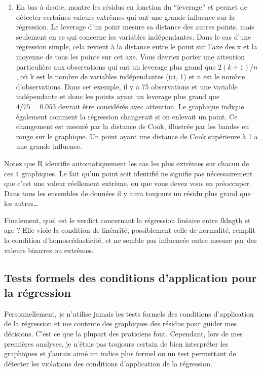 \documentclass[12pt,]{book}
\makeatletter
\newenvironment{kframe}{%
\medskip{}
\setlength{\fboxsep}{.8em}
 \def\at@end@of@kframe{}%
 \ifinner\ifhmode%
  \def\at@end@of@kframe{\end{minipage}}%
  \begin{minipage}{\columnwidth}%
 \fi\fi%
 \def\FrameCommand##1{\hskip\@totalleftmargin \hskip-\fboxsep
 \colorbox{shadecolor}{##1}\hskip-\fboxsep
     \hskip-\linewidth \hskip-\@totalleftmargin \hskip\columnwidth}%
 \MakeFramed {\advance\hsize-\width
   \@totalleftmargin\z@ \linewidth\hsize
   \@setminipage}}%
 {\par\unskip\endMakeFramed%
 \at@end@of@kframe}
\newenvironment{rmdblock}[1]
  {
  \begin{itemize}
  \renewcommand{\labelitemi}{
    \raisebox{-.7\height}[0pt][0pt]{
      {\setkeys{Gin}{width=3em,keepaspectratio}\texttt{[image: images/\#1]}}
    }
  }
  \setlength{\fboxsep}{1em}
  \begin{kframe}
  \item
  }
  {
  \end{kframe}
  \end{itemize}
  }
\newenvironment{rmdwarning}
  {\begin{rmdblock}{warning}}
  {\end{rmdblock}}
\makeatother
\begin{document}
\begin{enumerate}
\item
  En bas à droite, montre les résidus en fonction du ``leverage'' et permet de détecter certaines valeurs extrêmes qui ont une grande influence sur la régression. Le leverage d'un point mesure sa distance des autres points, mais seulement en ce qui concerne les variables indépendantes. Dans le cas d'une régression simple, cela revient à la distance entre le point sur l'axe des x et la moyenne de tous les points sur cet axe. Vous devriez porter une attention particulière aux observations qui ont un leverage plus grand que \(2(k+1)/n\), où k est le nombre de variables indépendantes (ici, 1) et n est le nombre d'observations. Dans cet exemple, il y a 75 observations et une variable indépendante et donc les points ayant un leverage plus grand que \(4 / 75 = 0.053\) devrait être considérés avec attention. Le graphique indique également comment la régression changerait si on enlevait un point. Ce changement est mesuré par la distance de Cook, illustrée par les bandes en rouge sur le graphique. Un point ayant une distance de Cook supérieure à 1 a une grande influence.
\end{enumerate}

\begin{rmdwarning}
Notez que R identifie automatiquement les cas les plus extrèmes sur chacun de ces 4 graphiques. Le fait qu'un point soit identifié ne signifie pas nécessairement que c'est une valeur réellement extrème, ou que vous devez vous en préoccuper. Dans tous les ensembles de données il y aura toujours un résidu plus grand que les autres\ldots{}
\end{rmdwarning}

Finalement, quel est le verdict concernant la régression linéaire entre fklngth et age ? Elle viole la condition de linéarité, possiblement celle de normalité, remplit la condition d'homoscédasticité, et ne semble pas influencée outre mesure par des valeurs bizarres ou extrêmes.

\hypertarget{tests-formels-des-conditions-dapplication-pour-la-ruxe9gression}{%
\subsection{Tests formels des conditions d'application pour la régression}\label{tests-formels-des-conditions-dapplication-pour-la-ruxe9gression}}

Personnellement, je n'utilise jamais les tests formels des conditions d'application de la régression et me contente des graphiques des résidus pour guider mes décisions. C'est ce que la plupart des praticiens font. Cependant, lors de mes premières analyses, je n'étais pas toujours certain de bien interpréter les graphiques et j'aurais aimé un indice plus formel ou un test permettant de détecter les violations des conditions d'application de la régression.
\end{document}
